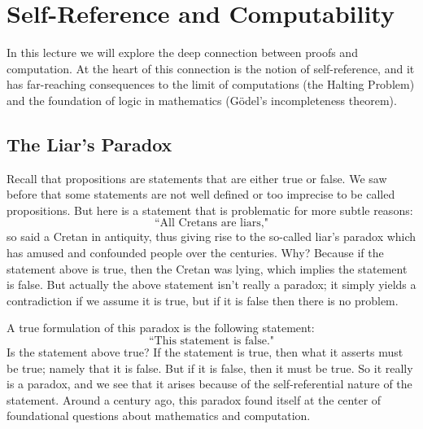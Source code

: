 \documentclass[11pt,fleqn]{article}
\begin{document}
\maketitle


\section*{Self-Reference and Computability}

In this lecture we will explore the deep connection between proofs and computation. At the heart of this connection is the notion of self-reference, and it has far-reaching consequences to the limit of computations (the Halting Problem) and the foundation of logic in mathematics (G\"odel's incompleteness theorem).



\subsection*{The Liar's Paradox}

Recall that propositions are statements that are either true or false.  We saw before that some statements
are not well defined or too imprecise to be called propositions. But here is a statement that
is problematic for more subtle reasons:
\vspace{-3pt}
$$\text{``All Cretans are liars,"}$$
so said a Cretan in antiquity, thus giving rise to the so-called liar's paradox which has 
amused and confounded people over the centuries. Why? Because if the statement above is true, then the Cretan was lying, which implies the statement is false. But actually the above statement isn't really
a paradox; it simply yields a contradiction if we assume it is true, but if it is false
then there is no problem.

A true formulation of this paradox is the following statement:
\vspace{-3pt}
$$\text{``This statement is false."}$$
Is the statement above true?  If the statement is true, then what 
it asserts must be true; namely that it is false.  But if it is false, then it must be true.  
So it really is a paradox, and we see that it arises because of the self-referential nature of the statement. Around a century ago, this paradox found itself at the center of 
foundational questions about mathematics and computation.
\end{document}
